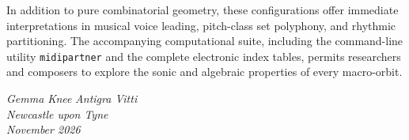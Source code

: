 In addition to pure combinatorial geometry, these configurations offer immediate interpretations in musical voice leading, pitch-class set polyphony, and rhythmic partitioning. The accompanying computational suite, including the command-line utility \texttt{midipartner} and the complete electronic index tables, permits researchers and composers to explore the sonic and algebraic properties of every macro-orbit.

\vspace{1.5cm}
\noindent
\begin{flushright}
\textit{Gemma Knee} \qquad \textit{Antigra Vitti}\\[0.25cm]
\textit{Newcastle upon Tyne}\\[0.15cm]
\textit{November 2026}
\end{flushright}

